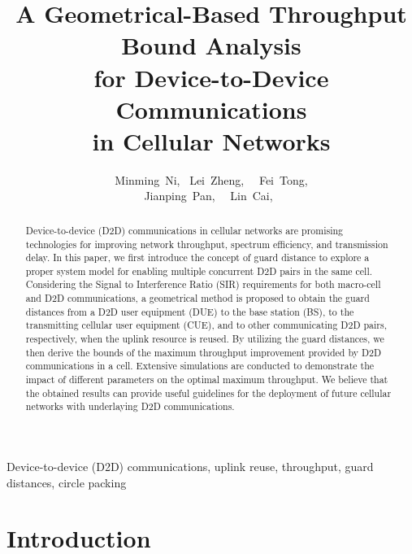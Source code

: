 \documentclass[journal, 10pt]{IEEEtran}
\begin{document}
\title{A Geometrical-Based Throughput Bound Analysis \\for
Device-to-Device Communications \\in Cellular Networks}
\author{
Minming~Ni,~ 
Lei~Zheng,~ 
~Fei~Tong, \\
Jianping~Pan,~ 
~Lin~Cai,~ 
}

\maketitle
\thispagestyle{empty}



\begin{abstract}
Device-to-device (D2D) communications in cellular
networks are promising technologies for improving network throughput,
spectrum efficiency, and transmission delay. In this paper, we first
introduce the concept of guard distance to explore a proper system
model for enabling multiple concurrent D2D pairs in the same cell.
Considering the Signal to Interference Ratio (SIR) requirements for
both macro-cell and D2D communications, a geometrical method is
proposed to obtain the guard distances from a D2D user equipment (DUE)
to the base station (BS), to the transmitting cellular user equipment
(CUE), and to other communicating D2D pairs, respectively, when the
uplink resource is reused. By utilizing the guard distances, we then
derive the bounds of the maximum throughput improvement provided by
D2D communications in a cell. Extensive simulations are conducted to
demonstrate the impact of different parameters on the optimal maximum
throughput. We believe that the obtained results can provide useful
guidelines for the deployment of future cellular networks with
underlaying D2D communications. 
\end{abstract}
\begin{IEEEkeywords} 
Device-to-device (D2D) communications, uplink
reuse, throughput, guard distances, circle packing 
\end{IEEEkeywords}



\section{Introduction} 
\end{document}
